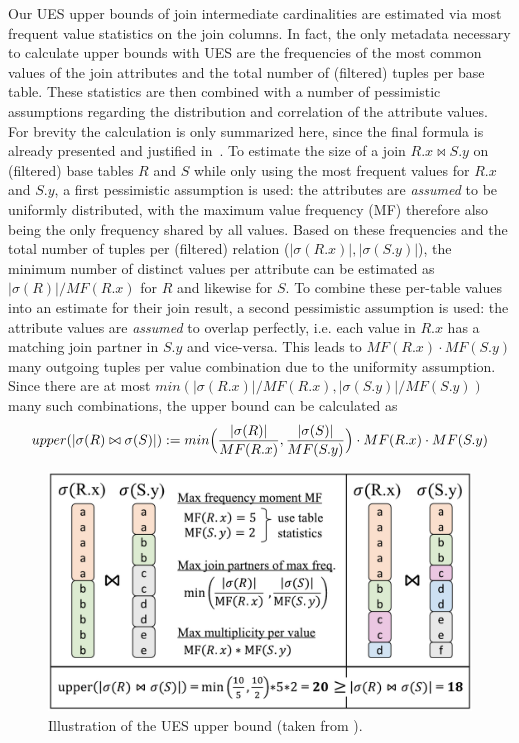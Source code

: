 Our UES upper bounds of join intermediate cardinalities are estimated via most frequent value statistics on the join columns. In fact, the only metadata necessary to calculate upper bounds with UES are the frequencies of the most common values of the join attributes and the total number of (filtered) tuples per base table. These statistics are then combined with a number of pessimistic assumptions regarding the distribution and correlation of the attribute values.
For brevity the calculation is only summarized here, since the final formula is already presented and justified in~\cite{hertzschuch-21-ues}.
To estimate the size of a join $R.x \bowtie S.y$ on (filtered) base tables $R$ and $S$ while only using the most frequent values for $R.x$ and $S.y$, a first pessimistic assumption is used: the attributes are \emph{assumed} to be uniformly distributed, with the maximum value frequency (MF) therefore also being the only frequency shared by all values. 
Based on these frequencies and the total number of tuples per (filtered) relation ($|\sigma(R.x)|, |\sigma(S.y)|$), the minimum number of distinct values per attribute can be estimated as $|\sigma(R)| / MF(R.x)$ for $R$ and likewise for $S$.
To combine these per-table values into an estimate for their join result, a second pessimistic assumption is used: the attribute values are \emph{assumed} to overlap perfectly, i.e. each value in $R.x$ has a matching join partner in $S.y$ and vice-versa. 
This leads to $MF(R.x) \cdot MF(S.y)$ many outgoing tuples per value combination due to the uniformity assumption. 
Since there are at most $min(|\sigma(R.x)| / MF(R.x), |\sigma(S.y)| / MF(S.y))$ many such combinations, the upper bound can be calculated as
$$upper(|\sigma(R) \bowtie \sigma(S)|) := min\Bigl(\frac{|\sigma(R)|}{MF(R.x)}, \frac{|\sigma(S)|}{MF(S.y)}\Bigr) \cdot MF(R.x) \cdot MF(S.y)$$

\begin{figure}[t]
    \centering
    \includegraphics[width=0.7\linewidth]{figures/upperBoundExplV6_.pdf}
    \caption{Illustration of the UES upper bound (taken from \cite{hertzschuch-21-ues}).}
    \label{fig:upperBoundExpl}
\end{figure}

